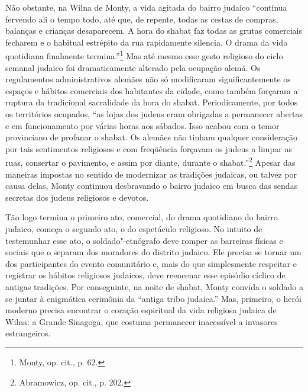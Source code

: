 Não obstante, na Wilna de Monty, a vida agitada do bairro judaico
``continua fervendo ali o tempo todo, até que, de repente, todas as
cestas de compras, balanças e crianças desaparecem. A hora do shabat faz
todas as grutas comerciais fecharem e o habitual estrépito da rua
rapidamente silencia. O drama da vida quotidiana finalmente
termina.''\footnote{Monty, op. cit., p. 62.} Mas até mesmo esse gesto
religioso do ciclo semanal judaico foi dramaticamente alterado pela
ocupação alemã. Os regulamentos administrativos alemães não só
modificaram significantemente os espaços e hábitos comerciais dos
habitantes da cidade, como também forçaram a ruptura da tradicional
sacralidade da hora do shabat. Periodicamente, por todos os territórios
ocupados, ``as lojas dos judeus eram obrigadas a permanecer abertas e em
funcionamento por várias horas aos sábados. Isso acabou com o temor
provinciano de profanar o shabat. Os alemães não tinham qualquer
consideração por tais sentimentos religiosos e com freqüência forçavam
os judeus a limpar as ruas, consertar o pavimento, e assim por diante,
durante o shabat.''\footnote{Abramowicz, op. cit., p. 202.} Apesar das
maneiras impostas no sentido de modernizar as tradições judaicas, ou
talvez por causa delas, Monty continuou desbravando o bairro judaico em
busca das sendas secretas dos judeus religiosos e devotos.

Tão logo termina o primeiro ato, comercial, do drama quotidiano do
bairro judaico, começa o segundo ato, o do espetáculo religioso. No
intuito de testemunhar esse ato, o soldado"-etnógrafo deve romper as
barreiras físicas e sociais que o separam dos moradores do distrito
judaico. Ele precisa se tornar um dos participantes do evento
comunitário e, mais do que simplesmente respeitar e registrar os hábitos
religiosos judaicos, deve reencenar esse episódio cíclico de antigas
tradições. Por conseguinte, na noite de shabat, Monty convida o soldado
a se juntar à enigmática cerimônia da ``antiga tribo judaica.'' Mas,
primeiro, o herói moderno precisa encontrar o coração espiritual da vida
religiosa judaica de Wilna: a Grande Sinagoga, que costuma permanecer
inacessível a invasores estrangeiros.

%

